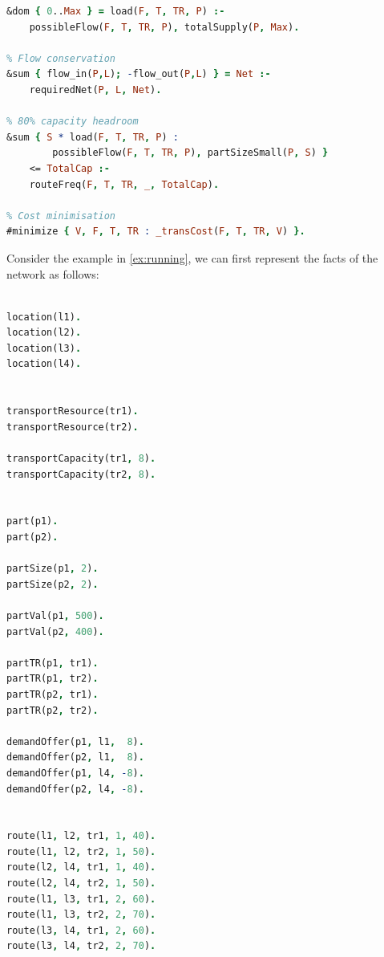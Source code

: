 \documentclass{article}
\begin{document}
\begin{lstlisting}[language=Prolog, caption={Stage 1 core constraints}, label={theory_stage1_constraints}]
% Flow domain
&dom { 0..Max } = load(F, T, TR, P) :-
    possibleFlow(F, T, TR, P), totalSupply(P, Max).

% Flow conservation
&sum { flow_in(P,L); -flow_out(P,L) } = Net :-
    requiredNet(P, L, Net).

% 80% capacity headroom
&sum { S * load(F, T, TR, P) :
        possibleFlow(F, T, TR, P), partSizeSmall(P, S) }
    <= TotalCap :-
    routeFreq(F, T, TR, _, TotalCap).

% Cost minimisation
#minimize { V, F, T, TR : _transCost(F, T, TR, V) }.
\end{lstlisting}
Consider the example in \ref{ex:running}, we can first represent the facts of the network as follows:
\begin{lstlisting}[language=Prolog, caption={Stage 1 core constraints}, label={example_instances}]

location(l1).
location(l2).
location(l3).
location(l4).


transportResource(tr1).
transportResource(tr2).

transportCapacity(tr1, 8).
transportCapacity(tr2, 8).


part(p1).
part(p2).

partSize(p1, 2).
partSize(p2, 2).

partVal(p1, 500).
partVal(p2, 400).

partTR(p1, tr1).
partTR(p1, tr2).
partTR(p2, tr1).
partTR(p2, tr2).

demandOffer(p1, l1,  8).
demandOffer(p2, l1,  8).
demandOffer(p1, l4, -8).
demandOffer(p2, l4, -8).


route(l1, l2, tr1, 1, 40).
route(l1, l2, tr2, 1, 50).
route(l2, l4, tr1, 1, 40).
route(l2, l4, tr2, 1, 50).
route(l1, l3, tr1, 2, 60).
route(l1, l3, tr2, 2, 70).
route(l3, l4, tr1, 2, 60).
route(l3, l4, tr2, 2, 70).

\end{lstlisting}
\end{document}
